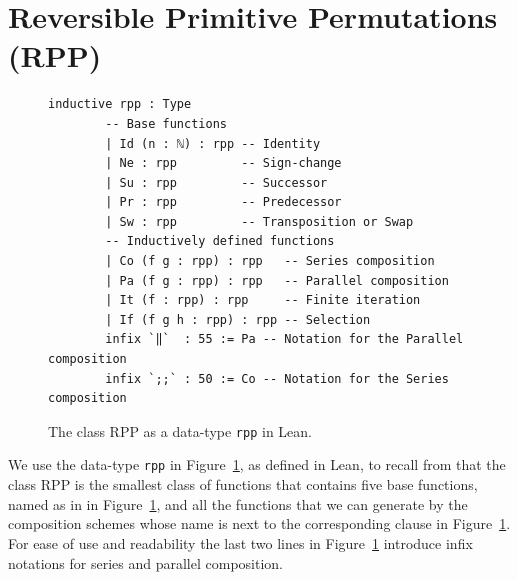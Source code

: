 \documentclass[preprint]{elsarticle}
\theoremstyle{remark}
\newcommand{\RPP}{\textsf{RPP}\xspace}
\newcommand{\LEAN}{\textsf{Lean}\xspace}
\begin{document}
\section{Reversible Primitive Permutations (\RPP) }
\label{section:Reversible Primitive Permutations}

\begin{figure}
    \centering
        \begin{lstlisting}[basicstyle=\small]
        inductive rpp : Type
        -- Base functions
        | Id (n : ℕ) : rpp -- Identity
        | Ne : rpp         -- Sign-change
        | Su : rpp         -- Successor
        | Pr : rpp         -- Predecessor
        | Sw : rpp         -- Transposition or Swap
        -- Inductively defined functions
        | Co (f g : rpp) : rpp   -- Series composition
        | Pa (f g : rpp) : rpp   -- Parallel composition
        | It (f : rpp) : rpp     -- Finite iteration
        | If (f g h : rpp) : rpp -- Selection
        infix `‖`  : 55 := Pa -- Notation for the Parallel composition
        infix `;;` : 50 := Co -- Notation for the Series composition
        \end{lstlisting}
    \caption{The class \RPP as a data-type \lstinline|rpp| in \LEAN.}
    \label{fig:RPP-LEAN}
\end{figure}

We use the data-type \lstinline|rpp| in Figure~\ref{fig:RPP-LEAN}, as defined in \LEAN, to recall from \cite{DBLP:journals/tcs/PaoliniPR20} that the class \RPP is the smallest class of functions
that contains five base functions, named as in in Figure~\ref{fig:RPP-LEAN}, and all the functions that we can generate by the composition schemes whose name is next to the corresponding clause in Figure~\ref{fig:RPP-LEAN}. For ease of use and readability the last two lines in Figure~\ref{fig:RPP-LEAN} introduce infix notations for series and parallel composition.
\end{document}
